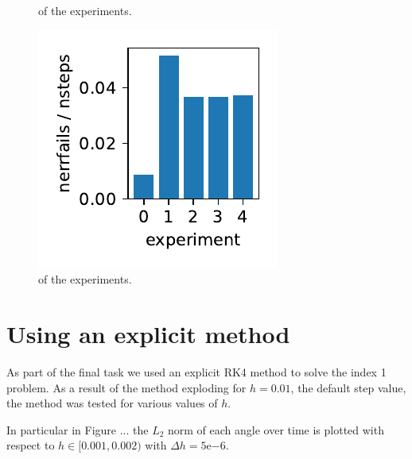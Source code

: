 \documentclass{report}
\begin{document}
\begin{figure}[h]
\begin{minipage}[t]{0.3\textwidth}
\caption{ of the experiments.}
\label{pl:njacs_nsteps_indx1}
\end{minipage}
\hfill
\begin{minipage}[t]{0.3\textwidth}
\centering
\includegraphics[width=\textwidth]{../Plots/Project2_main/Figure_712}
\caption{ of the experiments.}
\label{pl:nerrfails_nsteps_indx1}
\end{minipage}
\end{figure}

\section*{Using an explicit method}

As part of the final task we used an explicit RK4 method to solve the index 1 problem. As a result of the method exploding for $h=0.01$, the default step value, the method was tested for various values of $h$.

In particular in Figure ... the $L_2$ norm of each angle over time is plotted with respect to $h \in [0.001, 0.002)$ with $\Delta h = 5\mathrm{e}{-6}$.

\begin{figure}[h]
\begin{minipage}[t]{0.7\textwidth}
\centering
\end{minipage}
\end{figure}
\end{document}
